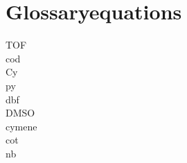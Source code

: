 
\chapter*{Glossaryequations}
\label{ch:glossaryequations}

\gls{TOF}\\
\gls{cod}\\
\gls{Cy}\\
\gls{py}\\
\gls{dbf}\\
\gls{DMSO}\\
\gls{cymene}\\
\gls{cot}\\
\gls{nb}